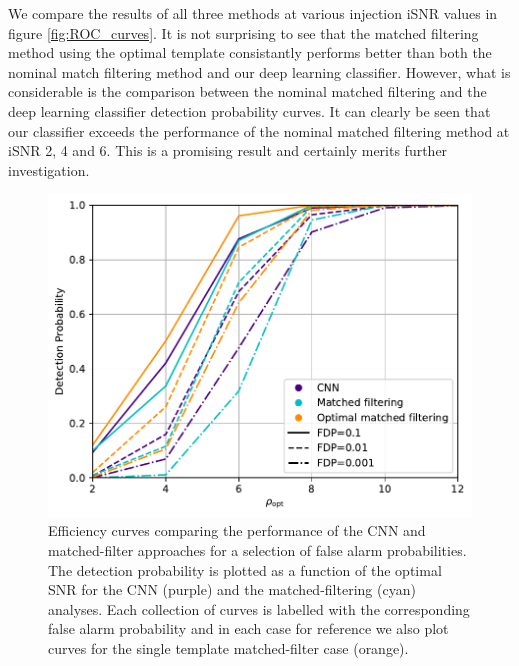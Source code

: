 \documentclass[%
showpacs,
 amsmath,amssymb,
 aps,
 twocolumn,
 prl,
 reprint,
floatfix,
]{revtex4-1}
\newcommand{\optsnr}{\rho_{\mathrm{opt}}}
\newcommand{\chris}[1]{\textbf{\textcolor{green}{CHRIS: #1}}}
\begin{document}
We compare the results of
all three methods at various injection iSNR values in figure
\ref{fig:ROC_curves}. It is not surprising to see that the matched filtering
method using the optimal template consistantly performs better than both the
nominal match filtering method and our deep learning classifier.  However, what
is considerable is the comparison between the nominal matched filtering and the
deep learning classifier detection probability curves. It can clearly be seen
that our classifier exceeds the performance of the nominal matched filtering
method at iSNR 2, 4 and 6. This is a promising result and certainly merits
further investigation.

%
%
\begin{figure}[]
\includegraphics[width=\columnwidth] {figures/efficiency.pdf}
\caption{Efficiency curves comparing the performance of the \ac{CNN} and
matched-filter approaches for a selection of false alarm probabilities. The
detection probability is plotted as a function of the optimal \ac{SNR} for the 
\ac{CNN} (purple) and the matched-filtering (cyan) analyses. Each collection of
curves is labelled with the corresponding false alarm probability and in each
case for reference we also plot curves for the single template matched-filter
case (orange).
\label{fig:efficiency_curve}}
\end{figure}
\end{document}
